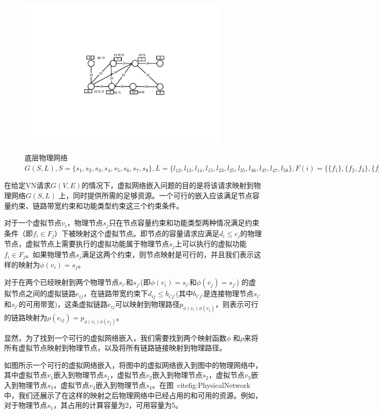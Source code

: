 \begin{figure}
\centering
\includegraphics[width=4in]{figures/PhysicalNetwork}\\
\caption{底层物理网络$G(S,L), S=\{s_1,s_2,s_3,s_4,s_5,s_6,s_7,s_8\}, L=\{l_{12},l_{13},l_{14},l_{15},l_{23},l_{25},l_{35},l_{36},l_{37},l_{47},l_{58}\}, F(i)=\{\{f_1\},\{f_2,f_3\},\{f_3\},\{f_4\},\{f_1,f_2\},\{f_1,f_4\},\{f_2,f_3\},\{f_2\}\}, c_i=\{5,7,7,10,6,9,8,10\}, b_{ij}=\{10,10,10,10,10,10,10,10,10,10,10\}$}\label{fig:PhysicalNetwork}
\end{figure}

在给定VN请求$G (V,E)$的情况下，虚拟网络嵌入问题的目的是将该请求映射到物理网络$G (S,L)$ 上，同时提供所需的足够资源。一个可行的嵌入应该满足节点容量约束、链路带宽约束和功能类型约束这三个约束条件。

对于一个虚拟节点$v_i$，物理节点$s_j$只在节点容量约束和功能类型两种情况满足约束条件（即${f_i} \in {F_j}$）下被映射这个虚拟节点。即节点的容量请求应满足$d_i\leq c_j$的物理节点，虚拟节点上需要执行的虚拟功能属于物理节点$s_j$上可以执行的虚拟功能${f_i} \in {F_j}$。如果物理节点$s_j$满足这两个约束，则节点映射是可行的，并且我们表示这样的映射为$\phi ({v_i}) = {s_j}$。

对于在两个已经映射到两个物理节点$s_{i'}$和$s_{j'}$(即$\phi({v_i}) = {s_{i'}}$和$\phi({v_j}) = {s_{j'}}$) 的虚拟节点之间的虚拟链路$e_{ij}$，在链路带宽约束下$d_{ij}\leq b_{i'j'}$(其中$b_{i'j'}$是连接物理节点$s_{i'}$和$s_{j'}$的可用带宽)，这条虚拟链路$e_{ij}$可以映射到物理路径$p_{\phi({v_i}) \phi({v_j})}$，则表示可行的链路映射为$\rho(e_{ij}) = p_{\phi({v_i}) \phi({v_j})}$。

显然，为了找到一个可行的虚拟网络嵌入，我们需要找到两个映射函数$\phi$ 和$\rho$来将所有虚拟节点映射到物理节点，以及将所有链路链接映射到物理路径。

如图\cite{fig:VirtualNetworkEmbedding}所示一个可行的虚拟网络嵌入，将图\cite{fig:VirtualNetworkRequest}中的虚拟网络嵌入到图\cite{fig:PhysicalNetwork}中的物理网络中，其中虚拟节点$v_1$嵌入到物理节点$s_1$，虚拟节点$v_2$嵌入到物理节点$s_2$，虚拟节点$v_3$嵌入到物理节点$s_3$，虚拟节点$v_4$嵌入到物理节点$s_4$。在图\ cite{fig:PhysicalNetwork}中，我们还展示了在这样的映射之后物理网络中已经占用的和可用的资源。例如，对于物理节点$s_1$，其占用的计算容量为2，可用容量为5。

